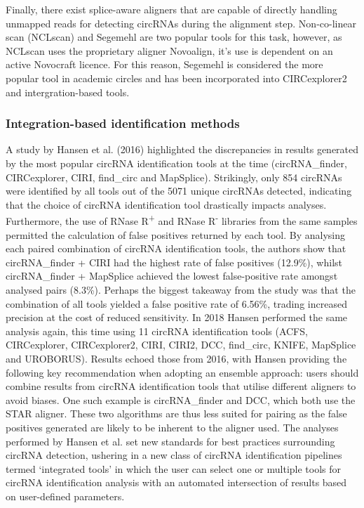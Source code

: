 Finally, there exist splice-aware aligners that are capable of directly handling unmapped reads for detecting circRNAs during the alignment step. Non-co-linear scan (NCLscan) \cite{NCLscan} and Segemehl are two popular tools for this task, however, as NCLscan uses the proprietary aligner Novoalign, it's use is dependent on an active Novocraft licence. For this reason, Segemehl is considered the more popular tool in academic circles and has been incorporated into CIRCexplorer2 and intergration-based tools.

\subsubsection{Integration-based identification methods} \label{Integration-based identification methods}
A study by Hansen et al. (2016) \cite{Hansen2016Apr} highlighted the discrepancies in results generated by the most popular circRNA identification tools at the time (circRNA\_finder, CIRCexplorer, CIRI, find\_circ and MapSplice). Strikingly, only 854 circRNAs were identified by all tools out of the 5071 unique circRNAs detected, indicating that the choice of circRNA identification tool drastically impacts analyses. Furthermore, the use of RNase R\textsuperscript{+} and RNase R\textsuperscript{-} libraries from the same samples permitted the calculation of false positives returned by each tool. By analysing each paired combination of circRNA identification tools, the authors show that circRNA\_finder + CIRI had the highest rate of false positives (12.9\%), whilst circRNA\_finder + MapSplice achieved the lowest false-positive rate amongst analysed pairs (8.3\%). Perhaps the biggest takeaway from the study was that the combination of all tools yielded a false positive rate of 6.56\%, trading increased precision at the cost of reduced sensitivity. In 2018 Hansen \cite{Hansen2018} performed the same analysis again, this time using 11 circRNA identification tools (ACFS, CIRCexplorer, CIRCexplorer2, CIRI, CIRI2, DCC, find\_circ, KNIFE, MapSplice and UROBORUS). Results echoed those from 2016, with Hansen providing the following key recommendation when adopting an ensemble approach: users should combine results from circRNA identification tools that utilise different aligners to avoid biases. One such example is circRNA\_finder and DCC, which both use the STAR aligner. These two algorithms are thus less suited for pairing as the false positives generated are likely to be inherent to the aligner used. The analyses performed by Hansen et al. set new standards for best practices surrounding circRNA detection, ushering in a new class of circRNA identification pipelines termed `integrated tools' in which the user can select one or multiple tools for circRNA identification analysis with an automated intersection of results based on user-defined parameters. \par
